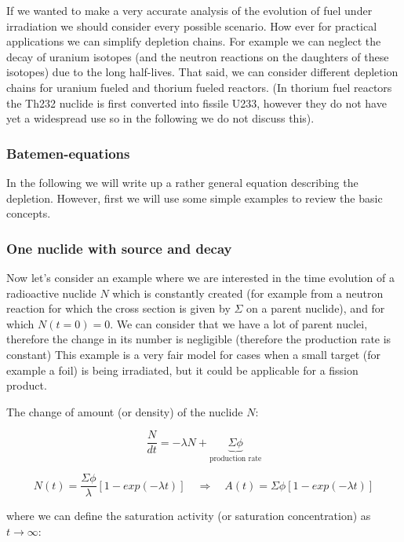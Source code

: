 If we wanted to  make a very accurate analysis of the evolution of fuel under irradiation we should consider every possible scenario. How ever for practical applications we can simplify depletion chains. For example we can neglect the decay of uranium isotopes (and the neutron reactions on the daughters of these isotopes) due to the long half-lives. That said, we can consider different depletion chains for uranium fueled and thorium fueled reactors. (In thorium fuel reactors the Th232 nuclide is first converted into fissile U233, however they do not have yet a widespread use so in the following we do not discuss this).

\subsubsection{Batemen-equations}

In the following we will write up a rather general equation describing the depletion. However, first we will use some simple examples to review the basic concepts.

\subsubsection*{One nuclide with source and decay}

Now let's consider an example where we are interested in the time evolution of a  radioactive nuclide $N$ which is constantly created (for example from a neutron reaction for which the cross section is given by $\Sigma$ on a parent nuclide), and for which $N(t=0)=0$. We can consider that we have a lot of parent nuclei, therefore the change in its number is negligible (therefore the production rate is constant) This example is a very fair model for cases when a small target (for example a foil) is being irradiated, but it could be applicable for a fission product.

The change of amount (or density) of the nuclide $N$:

\begin{equation}
\frac{N}{dt}=-\lambda N + \underbrace{\Sigma\phi}_{\text{production rate}}
\end{equation}

\begin{equation}
N(t)=\frac{\Sigma\phi}{\lambda}[1-exp(-\lambda t)] \quad \Rightarrow \quad A(t)=\Sigma\phi[1-exp(-\lambda t)]
\end{equation}

\noindent where we can define the saturation activity (or saturation concentration) as $t\rightarrow \infty$:

